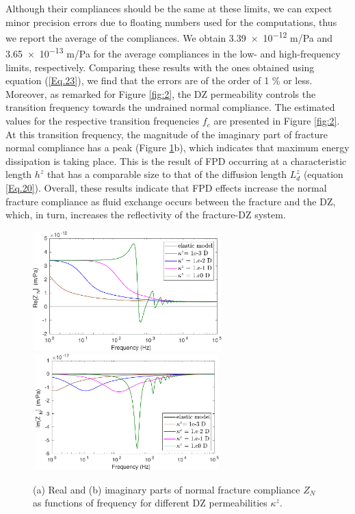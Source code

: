 \documentclass[draft]{agujournal2019}
\begin{document}
Although their compliances should be the same at these limits,  we can expect minor precision errors due to floating numbers used for the computations, thus we report the average of the compliances.
We obtain  \num{3.39e-12} m/Pa and \num{3.65e-13} m/Pa for the average compliances in the low- and high-frequency limits, respectively. Comparing these results with the ones obtained using equation (\ref{Eq.23}), we find that the errors are of the order of 1 \% or less.
Moreover, as remarked for Figure \ref{fig:2}, the DZ permeability controls the transition frequency towards the undrained normal compliance. The estimated values  for the respective transition frequencies $f_c$ are presented in Figure \ref{fig:2}. 
At this transition frequency, the magnitude of the imaginary part of fracture normal compliance has a peak (Figure \ref{fig:3}b), which indicates that maximum energy dissipation is taking place. This is the result of FPD occurring at a characteristic length $h^z$ that has a comparable size to that of the diffusion length $L_d^z$ (equation \eqref{Eq.20}).
Overall, these results indicate that FPD effects increase the normal fracture compliance as fluid exchange occurs between the fracture and the DZ, which, in turn, increases the reflectivity of the fracture-DZ system. 


\begin{figure}
\centering
    \subcaptionbox{}
      {
       \includegraphics[width=73mm, height=45 mm]{figures/elasporo_1mm_znsen_h20e-2.pdf}
        }
    \subcaptionbox{}
      {
        \includegraphics[width=73mm, height=45mm]{figures/elasporo_1mm_iznsen_h20e-2.pdf}
        }
\caption {(a) Real and (b) imaginary parts of  normal fracture compliance $Z_N$ as functions of frequency for different DZ permeabilities $\kappa^z$. } 
\label{fig:3}
\end{figure}
\end{document}
